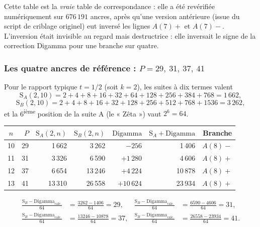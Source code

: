 \documentclass[11pt,a4paper]{article}
\newcommand{\SA}{\mathrm{S}_A}
\newcommand{\SB}{\mathrm{S}_B}
\begin{document}
Cette table est la \emph{vraie} table de correspondance : elle a été
revérifiée numériquement sur $676\,191$ ancres, après qu'une version
antérieure (issue du script de criblage originel) eut inversé les
lignes $A(7)+$ et $A(7)-$. L'inversion était invisible au regard mais
destructrice : elle inversait le signe de la correction Digamma pour
une branche sur quatre.

\subsubsection{Les quatre ancres de référence : \texorpdfstring{$P = 29,\ 31,\ 37,\ 41$}{P = 29, 31, 37, 41}}
Pour le rapport typique $t = 1/2$ (soit $k = 2$), les suites à dix termes
valent
\[
  \SA(2,10) = 2+4+8+16+32+64+128+256+384+768 = 1\,662,
\]
\[
  \SB(2,10) = 2+4+8+16+32+128+256+512+768+1536 = 3\,262,
\]
et la 6\textsuperscript{ième} position de la suite A (le « Zêta ») vaut
$2^{6} = 64$.

\begin{center}
\small
\begin{tabular}{@{}c r r r r r r@{}}
\toprule
\rowcolor{spectralgris}
$n$ & $P$ & $\SA(2,n)$ & $\SB(2,n)$ & $\mathrm{Digamma}$ & $\SA+\mathrm{Digamma}$ & Branche \\
\midrule
10 & 29  & 1\,662   & 3\,262   & $-256$   & 1\,406   & $A(8)-$ \\
11 & 31  & 3\,326   & 6\,590   & $+1\,280$ & 4\,606   & $A(8)+$ \\
12 & 37  & 6\,654   & 13\,246  & $+4\,224$ & 10\,878  & $A(8)+$ \\
13 & 41  & 13\,310  & 26\,558  & $+10\,624$ & 23\,934  & $A(8)+$ \\
\bottomrule
\end{tabular}
\end{center}

\vspace{0.3cm}
\begin{boiteformule}
\begin{align*}
  \frac{\SB - \mathrm{Digamma}_{\mathrm{calc.}}}{64}
  &= \frac{3262-1406}{64} = 29, &
    \frac{\SB - \mathrm{Digamma}_{\mathrm{calc.}}}{64}
  &= \frac{6590-4606}{64} = 31,\\
  \frac{\SB - \mathrm{Digamma}_{\mathrm{calc.}}}{64}
  &= \frac{13246-10878}{64} = 37, &
    \frac{\SB - \mathrm{Digamma}_{\mathrm{calc.}}}{64}
  &= \frac{26558-23934}{64} = 41.
\end{align*}
\end{boiteformule}
\end{document}
